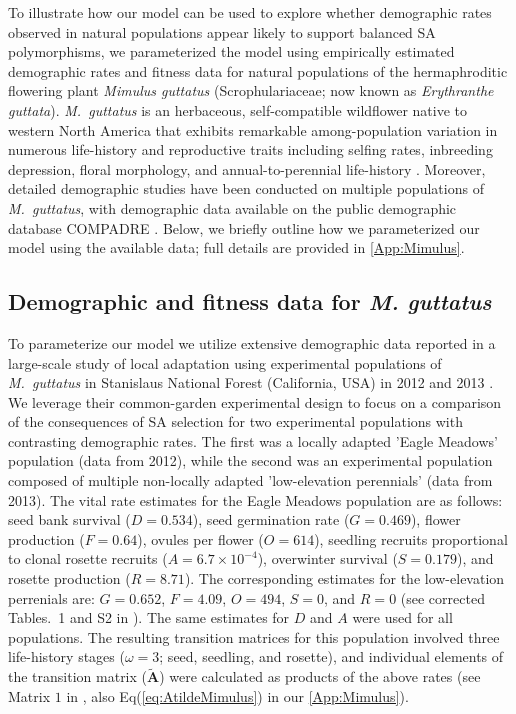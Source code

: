 \documentclass[11pt]{article}
\def\mbf#1{\mathbf{#1}}
\begin{document}
To illustrate how our model can be used to explore whether demographic rates observed in natural populations appear likely to support balanced SA polymorphisms, we parameterized the model using empirically estimated demographic rates and fitness data for natural populations of the hermaphroditic flowering plant {\itshape Mimulus guttatus} (Scrophulariaceae; now known as {\itshape Erythranthe guttata}). {\itshape M.~guttatus} is an herbaceous, self-compatible wildflower native to western North America that exhibits remarkable among-population variation in numerous life-history and reproductive traits including selfing rates, inbreeding depression, floral morphology, and annual-to-perennial life-history \citep[e.g.,][]{RitlandGanders1987, Ritland1990, Willis1993, Willis1999a, Willis1999b, WuWillis2008}. Moreover, detailed demographic studies have been conducted on multiple populations of {\itshape M.~guttatus}, with demographic data available on the public demographic database COMPADRE \citep{CompadreDB2020}. Below, we briefly outline how we parameterized our model using the available data; full details are provided in \ref{App:Mimulus}.

\subsection*{Demographic and fitness data for {\itshape M. guttatus}} \label{subsec:MguttMethods}

To parameterize our model we utilize extensive demographic data reported in a large-scale study of local adaptation using experimental populations of {\itshape M.~guttatus} in Stanislaus National Forest (California, USA) in 2012 and 2013 \citep{PetersonEtAl2016}. We leverage their common-garden experimental design to focus on a comparison of the consequences of SA selection for two experimental populations with contrasting demographic rates. The first was a locally adapted 'Eagle Meadows' population (data from 2012), while the second was an experimental population composed of multiple non-locally adapted 'low-elevation perennials' (data from 2013). The vital rate estimates for the Eagle Meadows population are as follows: seed bank survival ($D = 0.534$), seed germination rate ($G = 0.469$), flower production ($F = 0.64$), ovules per flower ($O = 614$), seedling recruits proportional to clonal rosette recruits ($A = 6.7 \times 10^{-4}$), overwinter survival ($S = 0.179$), and rosette production ($R = 8.71$). The corresponding estimates for the low-elevation perrenials are: $G = 0.652$, $F = 4.09$, $O = 494$, $S = 0$, and $R = 0$ (see corrected Tables.~1 and S2 in \citealt{PetersonEtAl2017}). The same estimates for $D$ and $A$ were used for all populations. The resulting transition matrices for this population involved three life-history stages ($\omega = 3$; seed, seedling, and rosette), and individual elements of the transition matrix ($\tilde{\mbf{A}}$) were calculated as products of the above rates (see Matrix $1$ in \citealt{PetersonEtAl2016}, also Eq(\ref{eq:AtildeMimulus}) in our \ref{App:Mimulus}).
\end{document}
